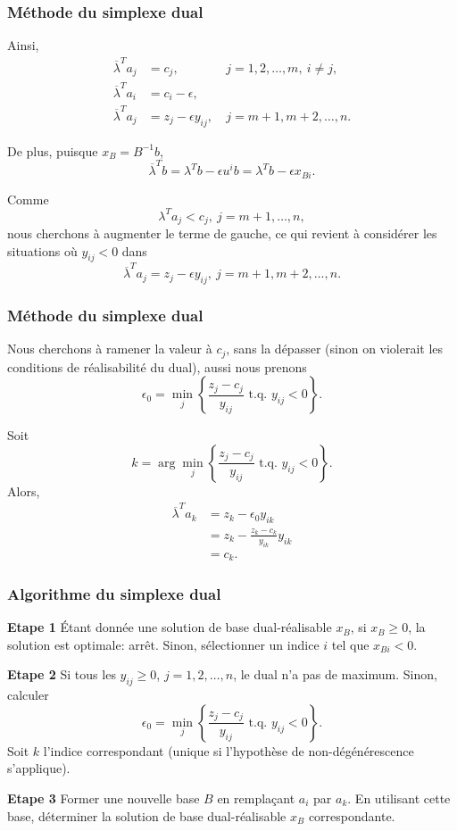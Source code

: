 \documentclass[usepdftitle=false]{beamer}
\begin{document}
\begin{frame}
	\frametitle{Méthode du simplexe dual}
	
	Ainsi,
	\begin{align*}
		\overline{\lambda}^T a_j &= c_j, &\ j = 1,2,\ldots, m,\ i \ne j, \\
		\overline{\lambda}^T a_i &= c_i - \epsilon, \\
		\overline{\lambda}^T a_j &= z_j - \epsilon y_{ij}, &\ j = m+1,m+2,\ldots, n.
	\end{align*}
	
	De plus, puisque $x_B = B^{-1}b$,
	\[
	\overline{\lambda}^T b = 
	\lambda^T b - \epsilon u^i b = 
	\lambda^T b - \epsilon x_{Bi}.
	\]
	
	\mbox{}
	
	Comme
	\[
	\lambda^T a_j < c_j,\ j = m+1, \ldots, n,
	\]
	nous cherchons à augmenter le terme de gauche, ce qui revient à considérer les situations où $y_{ij} < 0$ dans
	\[
	\overline{\lambda}^T a_j = z_j - \epsilon y_{ij}, \ j = m+1,m+2,\ldots, n.
	\]
	
\end{frame}

\begin{frame}
	\frametitle{Méthode du simplexe dual}
	
	Nous cherchons à ramener la valeur à $c_j$, sans la dépasser (sinon on violerait les conditions de réalisabilité du dual), aussi nous prenons
	\[
	\epsilon_0 = \min_j \left\lbrace \frac{z_j-c_j}{y_{ij}}\mbox{ t.q. } y_{ij} < 0 \right\rbrace.
	\]
	
	\mbox{}
	
	Soit
	\[
	k = \arg\min_j \left\lbrace \frac{z_j-c_j}{y_{ij}}\mbox{ t.q. } y_{ij} < 0 \right\rbrace.
	\]
	Alors,
	\begin{align*}
		\overline{\lambda}^T a_k &= z_k - \epsilon_0 y_{ik} \\
		&= z_k - \frac{z_k-c_k}{y_{ik}} y_{ik} \\
		& = c_k. 
	\end{align*}
	
\end{frame}

\begin{frame}
	\frametitle{Algorithme du simplexe dual}
	
	{\bf Etape 1}
	\'Etant donnée une solution de base dual-réalisable $x_B$, si $x_B \geq 0$, la solution est optimale: arrêt. Sinon, sélectionner un indice $i$ tel que $x_{Bi} < 0$.
	
	\mbox{}
	
	{\bf Etape 2}
	Si tous les $y_{ij} \geq 0$, $j = 1, 2,\ldots,n$, le dual n'a pas de maximum.
	Sinon, calculer
	\[
	\epsilon_0 = \min_j \left\lbrace \frac{z_j-c_j}{y_{ij}}\mbox{ t.q. } y_{ij} < 0 \right\rbrace.
	\]
	Soit $k$ l'indice correspondant (unique si l'hypothèse de non-dégénérescence s'applique).
	
	\mbox{}
	
	{\bf Etape 3}
	Former une nouvelle base $B$ en remplaçant $a_i$ par $a_k$.
	En utilisant cette base, déterminer la solution de base dual-réalisable $x_B$ correspondante.
	
\end{frame}
\end{document}
